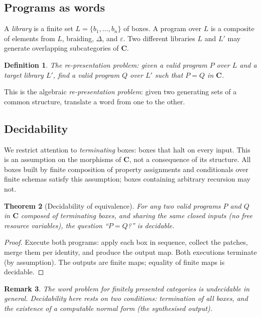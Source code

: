 \documentclass[11pt]{article}
\newtheorem{theorem}{Theorem}[section]
\newtheorem{definition}[theorem]{Definition}
\newtheorem{remark}[theorem]{Remark}
\newcommand{\cat}[1]{\mathbf{#1}}
\begin{document}
    \subsection{Programs as words}

    A \emph{library} is a finite set $L = \{b_1, \ldots, b_n\}$ of boxes. A program over
    $L$ is a composite of elements from $L$, braiding, $\Delta$, and $\varepsilon$. Two
    different libraries $L$ and $L'$ may generate overlapping subcategories of $\cat{C}$.

    \begin{definition}
        The \emph{re-presentation problem}: given a valid program $P$ over $L$ and a
        target library $L'$, find a valid program $Q$ over $L'$ such that $P = Q$ in
        $\cat{C}$.
    \end{definition}

    This is the algebraic \emph{re-presentation problem}: given two generating sets of a
    common structure, translate a word from one to the other.

    \subsection{Decidability}

    We restrict attention to \emph{terminating} boxes: boxes that halt on every input.
    This is an assumption on the morphisms of $\cat{C}$, not a consequence of its
    structure. All boxes built by finite composition of property assignments and
    conditionals over finite schemas satisfy this assumption; boxes containing arbitrary
    recursion may not.

    \begin{theorem}[Decidability of equivalence]\label{thm:decide}
        For any two valid programs $P$ and $Q$ in $\cat{C}$ composed of terminating
        boxes, and sharing the same closed inputs (no free resource variables), the
        question ``$P = Q$?'' is decidable.
    \end{theorem}

    \begin{proof}
        Execute both programs: apply each box in sequence, collect the patches, merge them
        per identity, and produce the output map. Both executions terminate (by
        assumption). The outputs are finite maps; equality of finite maps is decidable.
    \end{proof}

    \begin{remark}
        The word problem for finitely presented categories is undecidable in general.
        Decidability here rests on two conditions: termination of all boxes, and the
        existence of a computable normal form (the synthesised output).
    \end{remark}
\end{document}
